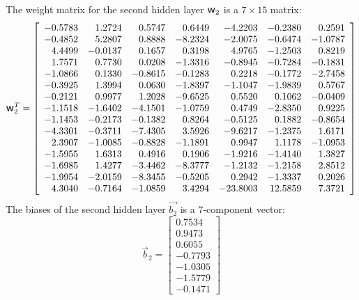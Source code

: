 \documentclass[twoside,english,1p,final,sort&compress]{elsarticle}
\theoremstyle{plain}
\DeclareRobustCommand{\w}{\mbox{\large\ensuremath{\mathsf{w}}}}
\begin{document}
The weight matrix for the second hidden layer $\w_2$ is a $7\times15$ matrix:
\begin{equation*}
\w_2^T = \left[
\begin{array}{rrrrrrr}
	-0.5783 & 1.2724  & 0.5747  & 0.6449  & -4.2203  & -0.2380 & 0.2591  \\
	-0.4852 & 5.2807  & 0.8888  & -8.2324 & -2.0075  & -0.6474 & -1.0787 \\
	4.4499  & -0.0137 & 0.1657  & 0.3198  & 4.9765   & -1.2503 & 0.8219  \\
	1.7571  & 0.7730  & 0.0208  & -1.3316 & -0.8945  & -0.7284 & -0.1831 \\
	-1.0866 & 0.1330  & -0.8615 & -0.1283 & 0.2218   & -0.1772 & -2.7458 \\
	-0.3925 & 1.3994  & 0.0630  & -1.8397 & -1.1047  & -1.9839 & 0.5767  \\
	-0.2121 & 0.9977  & 1.2028  & -9.6525 & 0.5520   & 0.1062  & -0.0409 \\
	-1.1518 & -1.6402 & -4.1501 & -1.0759 & 0.4749   & -2.8350 & 0.9225  \\
	-1.1453 & -0.2173 & -0.1382 & 0.8264  & -0.5125  & 0.1882  & -0.8654 \\
	-4.3301 & -0.3711 & -7.4305 & 3.5926  & -9.6217  & -1.2375 & 1.6171  \\
	2.3907  & -1.0085 & -0.8828 & -1.1891 & 0.9947   & 1.1178  & -1.0953 \\
	-1.5955 & 1.6313  & 0.4916  & 0.1906  & -1.9216  & -1.4140 & 1.3827  \\
	-1.6985 & 1.4277  & -3.4462 & -8.3777 & -1.2132  & -1.2158 & 2.8512  \\
	-1.9954 & -2.0159 & -8.3455 & -0.5205 & 0.2942   & -1.3337 & 0.2026  \\
	4.3040  & -0.7164 & -1.0859 & 3.4294  & -23.8003 & 12.5859 & 7.3721
\end{array}\right]
\end{equation*}
The biases of the second hidden layer $\overrightarrow{b_2}$ is a 7-component vector:
\begin{equation*}
\overrightarrow{b}_2 = \left[
\begin{array}{r}
	0.7534  \\
	0.9473  \\
	0.6055  \\
	-0.7793 \\
	-1.0305 \\
	-1.5779 \\
	-0.1471
\end{array}\right]
\end{equation*}
\end{document}
